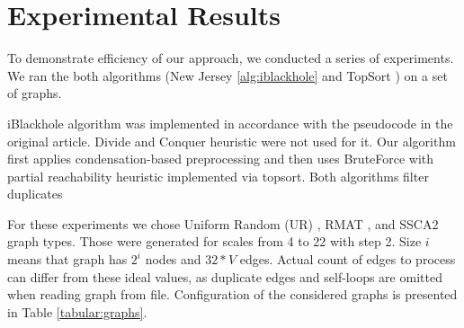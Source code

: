 \documentclass{svproc}
\begin{document}
\section{Experimental Results}
To demonstrate efficiency of our approach, we conducted a series of experiments. We ran the both algorithms (New Jersey \ref{alg:iblackhole} and TopSort ) on a 
set of graphs. 

iBlackhole algorithm was implemented in accordance with the pseudocode in the original article. Divide and Conquer heuristic were not used for it.
Our algorithm first applies condensation-based preprocessing and then uses BruteForce with partial reachability heuristic implemented via topsort.
Both algorithms filter duplicates 

For these experiments we chose Uniform Random (UR) \cite{random-uniform}, RMAT \cite{chakrabarti2004r},  and SSCA2 \cite{bader2005design} graph types. Those were generated for scales from 4 to 22
with step 2. Size $i$ means that graph has $2^i$ nodes and $32*V$ edges. Actual count of edges to process can differ from these ideal values, as duplicate edges and self-loops are omitted when reading graph from file. Configuration of the considered graphs is presented in Table \ref{tabular:graphs}.
\end{document}
